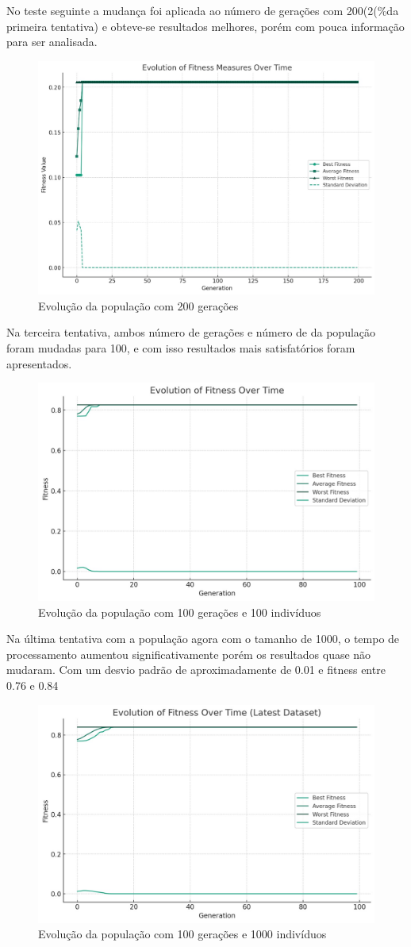 \documentclass[12pt]{article}
\begin{document}
No teste seguinte a mudança  foi aplicada ao número de gerações com 200(2(\%da primeira tentativa) e obteve-se resultados melhores, porém com pouca informação para ser analisada.

\begin{figure}[h]
    \centering
    \includegraphics[width=0.5\linewidth]{2tentativa.png}
    \caption{Evolução da população com 200 gerações}
    \label{fig: second-attempt}
\end{figure}

Na terceira tentativa, ambos número de gerações e número de da população foram mudadas para 100, e com isso resultados mais satisfatórios foram apresentados.

\begin{figure}[H]
    \centering
    \includegraphics[width=0.5\linewidth]{3tentativa.png}
    \caption{Evolução da população com 100 gerações e 100 indivíduos}
    \label{fig:third-attempt}
\end{figure}

Na última tentativa com a população agora com o tamanho de 1000, o tempo de processamento aumentou significativamente porém os resultados quase não mudaram. Com um desvio padrão de aproximadamente de 0.01 e fitness entre 0.76 e 0.84

\begin{figure}[h]
    \centering
    \includegraphics[width=0.5\linewidth]{4tentativa.png}
    \caption{Evolução da população com 100 gerações e 1000 indivíduos}
    \label{fig:fourth-attempt}
\end{figure}
\end{document}
